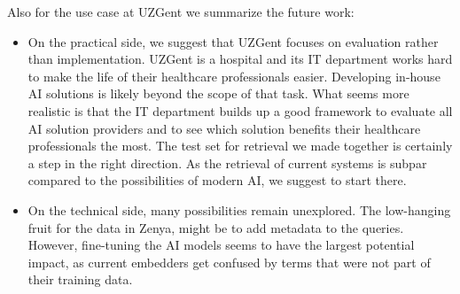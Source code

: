 Also for the use case at UZGent we summarize the future work:
\begin{itemize}
    \item On the practical side, we suggest that UZGent focuses on evaluation rather than implementation. UZGent is a hospital and its IT department works hard to make the life of their healthcare professionals easier. Developing in-house AI solutions is likely beyond the scope of that task. What seems more realistic is that the IT department builds up a good framework to evaluate all AI solution providers and to see which solution benefits their healthcare professionals the most. The test set for retrieval we made together is certainly a step in the right direction. As the retrieval of current systems is subpar compared to the possibilities of modern AI, we suggest to start there.
    \item On the technical side, many possibilities remain unexplored. The low-hanging fruit for the data in Zenya, might be to add metadata to the queries. However, fine-tuning the AI models seems to have the largest potential impact, as current embedders get confused by terms that were not part of their training data.
\end{itemize}
